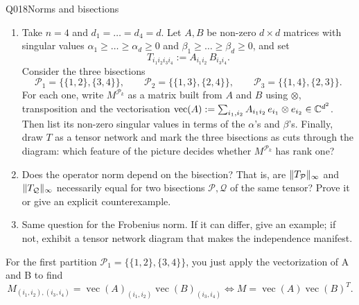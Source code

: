 \begin{entry}{Q018}{Norms and bisections}
\begin{problem}
\begin{enumerate}[label=\textbf{(\alph*)},leftmargin=*]
  \item Take $n=4$ and $d_1=\dots=d_4=d$. Let $A,B$ be non-zero $d\times d$ matrices with
        singular values $\alpha_1\ge\dots\ge\alpha_d\ge 0$ and
        $\beta_1\ge\dots\ge\beta_d\ge 0$, and set
        \[
          T_{i_1 i_2 i_3 i_4} := A_{i_1 i_2}\,B_{i_3 i_4}.
        \]
        Consider the three bisections
        \[
          \mathcal{P}_1=\{\{1,2\},\{3,4\}\},\qquad
          \mathcal{P}_2=\{\{1,3\},\{2,4\}\},\qquad
          \mathcal{P}_3=\{\{1,4\},\{2,3\}\}.
        \]
        For each one, write $M^{\mathcal{P}_k}$ as a matrix built from $A$ and $B$ using
        $\otimes$, transposition and the vectorisation
        $\operatorname{vec}(A):=\sum_{i_1,i_2}A_{i_1 i_2}\,e_{i_1}\otimes e_{i_2}\in\mathbb{C}^{d^2}$.
        Then list its non-zero singular values in terms of the $\alpha$'s and
        $\beta$'s. Finally, draw $T$ as a tensor network and mark the three bisections
        as cuts through the diagram: which feature of the picture decides whether
        $M^{\mathcal{P}_k}$ has rank one?
  \item Does the operator norm depend on the bisection? That is, are
        $\lVert T_{\mathcal{P}}\rVert_{\infty}$ and $\lVert T_{\mathcal{Q}}\rVert_{\infty}$ necessarily equal for
        two bisections $\mathcal{P},\mathcal{Q}$ of the same tensor? Prove it or give an
        explicit counterexample.
  \item Same question for the Frobenius norm. If it can differ, give an example; if not,
        exhibit a tensor network diagram that makes the independence manifest.
\end{enumerate}
\end{problem}


\begin{solution}[a]


For the first partition $ \mathcal{P}_1=\{\{1,2\},\{3,4\}\}$, you just apply the vectorization of A and B to find
\begin{equation}
    M_{(i_1,i_2),(i_3,i_4)}
    = \operatorname{vec}(A)_{(i_1,i_2)}\operatorname{vec}(B)_{(i_3,i_4)}
    \iff M = \operatorname{vec}(A) \operatorname{vec}(B)^T.
    \label{M_parition1}
\end{equation}
\begin{center}
\end{center}


\end{solution}
\end{entry}
